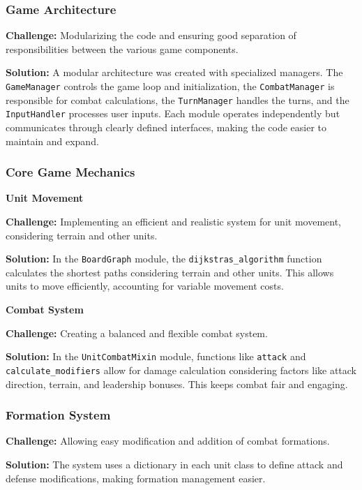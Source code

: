 \subsubsection{Game Architecture}
\textbf{Challenge:} Modularizing the code and ensuring good separation of responsibilities between the various game components.

\textbf{Solution:} A modular architecture was created with specialized managers. The \texttt{GameManager} controls the game loop and initialization, the \texttt{CombatManager} is responsible for combat calculations, the \texttt{TurnManager} handles the turns, and the \texttt{InputHandler} processes user inputs. Each module operates independently but communicates through clearly defined interfaces, making the code easier to maintain and expand.

\subsubsection{Core Game Mechanics}

\noindent\textbf{Unit Movement}
\vspace{5pt}

\textbf{Challenge:} Implementing an efficient and realistic system for unit movement, considering terrain and other units.

\textbf{Solution:} In the \texttt{BoardGraph} module, the \texttt{dijkstras\_algorithm} function calculates the shortest paths considering terrain and other units. This allows units to move efficiently, accounting for variable movement costs.

\vspace{5pt}
\noindent \textbf{Combat System}
\vspace{5pt}

\textbf{Challenge:} Creating a balanced and flexible combat system.

\textbf{Solution:} In the \texttt{UnitCombatMixin} module, functions like \texttt{attack} and \texttt{calculate\_modifiers} allow for damage calculation considering factors like attack direction, terrain, and leadership bonuses. This keeps combat fair and engaging.

\subsubsection{Formation System}
\textbf{Challenge:} Allowing easy modification and addition of combat formations.

\textbf{Solution:} The system uses a dictionary in each unit class to define attack and defense modifications, making formation management easier.

